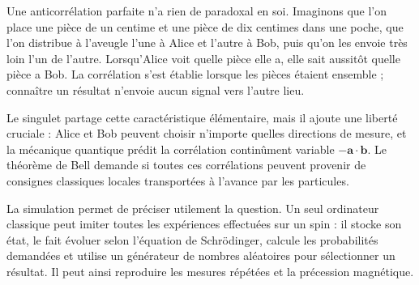 Une anticorrélation parfaite n’a rien de paradoxal en soi. Imaginons que l’on place une pièce de un centime et une pièce de dix centimes dans une poche, que l’on distribue à l’aveugle l’une à Alice et l’autre à Bob, puis qu’on les envoie très loin l’un de l’autre. Lorsqu’Alice voit quelle pièce elle a, elle sait aussitôt quelle pièce a Bob. La corrélation s’est établie lorsque les pièces étaient ensemble ; connaître un résultat n’envoie aucun signal vers l’autre lieu.

Le singulet partage cette caractéristique élémentaire, mais il ajoute une liberté cruciale : Alice et Bob peuvent choisir n’importe quelles directions de mesure, et la mécanique quantique prédit la corrélation continûment variable \(-\bm a\cdot\bm b\). Le théorème de Bell demande si toutes ces corrélations peuvent provenir de consignes classiques locales transportées à l’avance par les particules.

\begin{classroomqa}
\end{classroomqa}

\begin{classroomqa}
\end{classroomqa}

La simulation permet de préciser utilement la question. Un seul ordinateur classique peut imiter toutes les expériences effectuées sur un spin : il stocke son état, le fait évoluer selon l’équation de Schr\"odinger, calcule les probabilités demandées et utilise un générateur de nombres aléatoires pour sélectionner un résultat. Il peut ainsi reproduire les mesures répétées et la précession magnétique.

